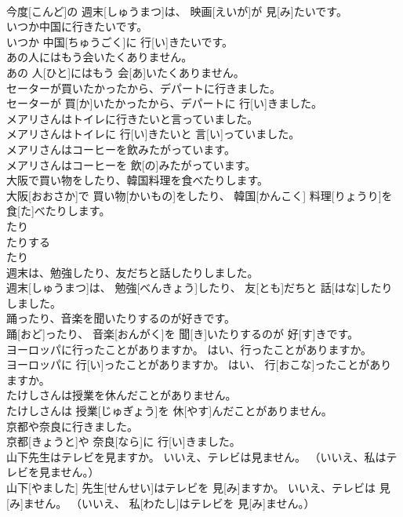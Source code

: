 \documentclass[8pt]{extreport}
\begin{document}
\begin{CJK}{UTF8}{min}
\\	今度[こんど]の 週末[しゅうまつ]は、 映画[えいが]が 見[み]たいです。	
\\	いつか中国に行きたいです。	
\\	いつか 中国[ちゅうごく]に 行[い]きたいです。	
\\	あの人にはもう会いたくありません。	
\\	あの 人[ひと]にはもう 会[あ]いたくありません。	
\\	セーターが買いたかったから、デパートに行きました。	
\\	セーターが 買[か]いたかったから、デパートに 行[い]きました。	
\\	メアリさんはトイレに行きたいと言っていました。	
\\	メアリさんはトイレに 行[い]きたいと 言[い]っていました。	
\\	メアリさんはコーヒーを飲みたがっています。	
\\	メアリさんはコーヒーを 飲[の]みたがっています。	
\\	大阪で買い物をしたり、韓国料理を食べたりします。	
\\	大阪[おおさか]で 買い物[かいもの]をしたり、 韓国[かんこく] 料理[りょうり]を 食[た]べたりします。	
\\	たり
\\	たりする	
\\	たり
\\	週末は、勉強したり、友だちと話したりしました。	
\\	週末[しゅうまつ]は、 勉強[べんきょう]したり、 友[とも]だちと 話[はな]したりしました。	
\\	踊ったり、音楽を聞いたりするのが好きです。	
\\	踊[おど]ったり、 音楽[おんがく]を 聞[き]いたりするのが 好[す]きです。	
\\	ヨーロッパに行ったことがありますか。 はい、行ったことがありますか。	
\\	ヨーロッパに 行[い]ったことがありますか。 はい、 行[おこな]ったことがありますか。	
\\	たけしさんは授業を休んだことがありません。	
\\	たけしさんは 授業[じゅぎょう]を 休[やす]んだことがありません。	
\\	京都や奈良に行きました。	
\\	京都[きょうと]や 奈良[なら]に 行[い]きました。	
\\	山下先生はテレビを見ますか。 いいえ、テレビは見ません。 （いいえ、私はテレビを見ません。）	
\\	山下[やました] 先生[せんせい]はテレビを 見[み]ますか。 いいえ、テレビは 見[み]ません。 （いいえ、 私[わたし]はテレビを 見[み]ません。）	

\end{CJK}
\end{document}
